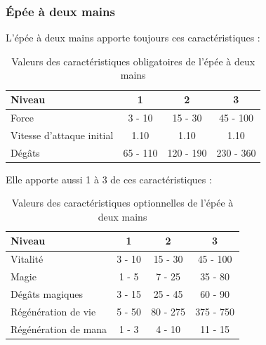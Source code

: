 \documentclass[11pt, a4paper, oneside]{report}
\begin{document}
\subsubsection{Épée à deux mains}
L'épée à deux mains apporte toujours ces caractéristiques :
\begin{table}[H]
\begin{center}
\begin{tabular}{| l | c | c | c |}
  \hline      
  Niveau 				& 1 & 2 & 3\\ \hline \hline                 
  Force 				& 3 - 10 & 15 - 30 & 45 - 100\\ \hline
  Vitesse d'attaque initial	& 1.10 & 1.10 & 1.10\\ \hline
  Dégâts 				& 65 - 110 & 120 - 190 & 230 - 360\\ \hline
\end{tabular}
\caption{Valeurs des caractéristiques obligatoires de l'épée à deux mains}
\end{center}
\end{table}
Elle apporte aussi 1 à 3 de ces caractéristiques :
\begin{table}[H]
\begin{center}
\begin{tabular}{| l | c | c | c |}
  \hline      
  Niveau 				& 1 & 2 & 3\\ \hline \hline
  Vitalité 				& 3 - 10 & 15 - 30 & 45 - 100\\ \hline
  Magie 				& 1 - 5 & 7 - 25 & 35 - 80\\ \hline
  Dégâts magiques 		& 3 - 15 & 25 - 45 & 60 - 90\\ \hline
  Régénération de vie 	& 5 - 50  & 80 - 275 & 375 - 750\\ \hline
  Régénération de mana 	& 1 - 3  & 4 - 10 & 11 - 15\\ \hline
\end{tabular}
\caption{Valeurs des caractéristiques optionnelles de l'épée à deux mains}
\end{center}
\end{table}
\end{document}
